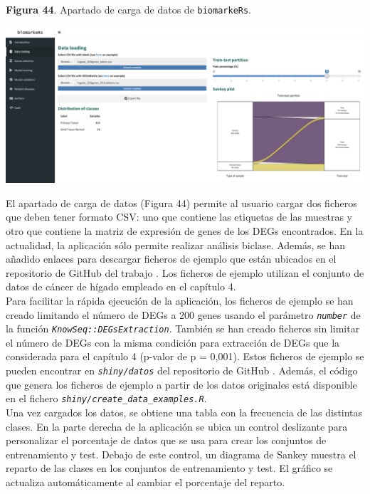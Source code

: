 \begin{center}
	\textbf{Figura 44}. Apartado de carga de datos de \texttt{biomarkeRs}.
\end{center}

\begin{center}
	\includegraphics[width=.90\textwidth]{figuras/44_data_loading.png} \\
\end{center}

El apartado de carga de datos (Figura 44) permite al usuario cargar dos ficheros que deben tener formato CSV: uno que contiene las etiquetas de las muestras y otro que contiene la matriz de expresión de genes de los DEGs encontrados. En la actualidad, la aplicación sólo permite realizar análisis biclase. Además, se han añadido  enlaces para descargar ficheros de ejemplo que están ubicados en el repositorio de GitHub del trabajo \cite{Redondo-Sanchez2020}. Los ficheros de ejemplo utilizan el conjunto de datos de cáncer de hígado empleado en el capítulo 4.\\

Para facilitar la rápida ejecución de la aplicación, los ficheros de ejemplo se han creado limitando el número de DEGs a 200 genes usando el parámetro \textit{\texttt{number}} de la función \textit{\texttt{KnowSeq::DEGsExtraction}}. También se han creado ficheros sin limitar el número de DEGs con la misma condición para extracción de DEGs que la considerada para el capítulo 4 (p-valor de p = 0,001). Estos ficheros de ejemplo se pueden encontrar en \textit{\texttt{shiny/datos}} del repositorio de GitHub \cite{Redondo-Sanchez2020}. Además, el código que genera los ficheros de ejemplo a partir de los datos originales está disponible en el fichero \textit{\texttt{shiny/create\_data\_examples.R}}.\\

Una vez cargados los datos, se obtiene una tabla con la frecuencia de las distintas clases. En la parte derecha de la aplicación se ubica un control deslizante para personalizar el porcentaje de datos que se usa para crear los conjuntos de entrenamiento y test. Debajo de este control, un diagrama de Sankey muestra el reparto de las clases en los conjuntos de entrenamiento y test. El gráfico se actualiza automáticamente al cambiar el porcentaje del reparto.

